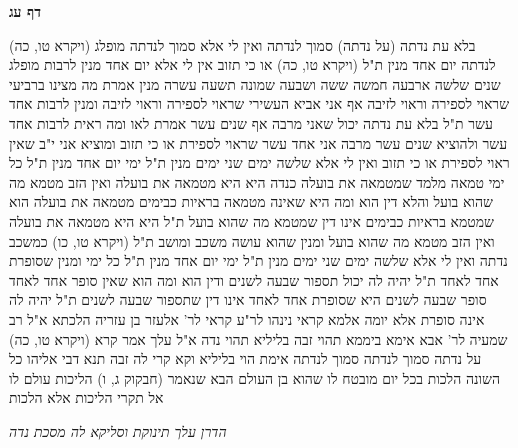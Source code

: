 \documentclass[12pt, openany]{book}
\newcommand{\sethebfont}{
\fontsize{10.5pt}{21.0pt} \selectfont
}
\newcommand{\twocol}[1]{
	{\sethebfont \begin{multicols}{2}
			#1
	\end{multicols}}	
}
\newcommand{\sectname}{}
\newcommand{\newsection}[1]{
	\addcontentsline{toc}{section}{#1}
	\renewcommand{\sectname}{#1}	
	\vspace{-\baselineskip}
	\begin{center}
		\textbf{%
\fontsize{16pt}{16pt}\selectfont
			#1}
	\end{center}
	\vspace{-\baselineskip}
	\nopagebreak
}
\begin{document}
\newsection{דף עג}
\twocol{(ויקרא טו, כה) בלא עת נדתה (על נדתה) סמוך לנדתה 
ואין לי אלא סמוך לנדתה מופלג לנדתה יום אחד מנין ת"ל (ויקרא טו, כה) או כי תזוב 
אין לי אלא יום אחד מנין לרבות מופלג שנים שלשה ארבעה חמשה ששה ושבעה שמונה תשעה עשרה מנין 
אמרת מה מצינו ברביעי שראוי לספירה וראוי לזיבה אף אני אביא העשירי שראוי לספירה וראוי לזיבה 
ומנין לרבות אחד עשר ת"ל בלא עת נדתה יכול שאני מרבה אף שנים עשר אמרת לאו 
ומה ראית לרבות אחד עשר ולהוציא שנים עשר מרבה אני אחד עשר שראוי לספירת או כי תזוב ומוציא אני י"ב שאין ראוי לספירת או כי תזוב 
ואין לי אלא שלשה ימים שני ימים מנין ת"ל ימי יום אחד מנין ת"ל כל ימי
טמאה מלמד שמטמאה את בועלה כנדה היא היא מטמאה את בועלה ואין הזב מטמא מה שהוא בועל 
והלא דין הוא ומה היא שאינה מטמאה בראיות כבימים מטמאה את בועלה הוא שמטמא בראיות כבימים אינו דין שמטמא מה שהוא בועל ת"ל היא היא מטמאה את בועלה ואין הזב מטמא מה שהוא בועל 
ומנין שהוא עושה משכב ומושב ת"ל (ויקרא טו, כו) כמשכב נדתה 
ואין לי אלא שלשה ימים שני ימים מנין ת"ל ימי יום אחד מנין ת"ל כל ימי 
ומנין שסופרת אחד לאחד ת"ל יהיה לה יכול תספור שבעה לשנים ודין הוא ומה הוא שאין סופר אחד לאחד סופר שבעה לשנים היא שסופרת אחד לאחד אינו דין שתספור שבעה לשנים ת"ל יהיה לה אינה סופרת אלא יומה
אלמא קראי נינהו לר"ע קראי לר' אלעזר בן עזריה הלכתא 
א"ל רב שמעיה לר' אבא אימא ביממא תהוי זבה בליליא תהוי נדה א"ל עלך אמר קרא (ויקרא טו, כה) על נדתה סמוך לנדתה סמוך לנדתה אימת הוי בליליא וקא קרי לה זבה 
תנא דבי אליהו כל השונה הלכות בכל יום מובטח לו שהוא בן העולם הבא שנאמר (חבקוק ג, ו) הליכות עולם לו אל תקרי הליכות אלא הלכות
\par \par {\large\emph{הדרן עלך תינוקת וסליקא לה מסכת נדה}}\par \par 
}
\end{document}
